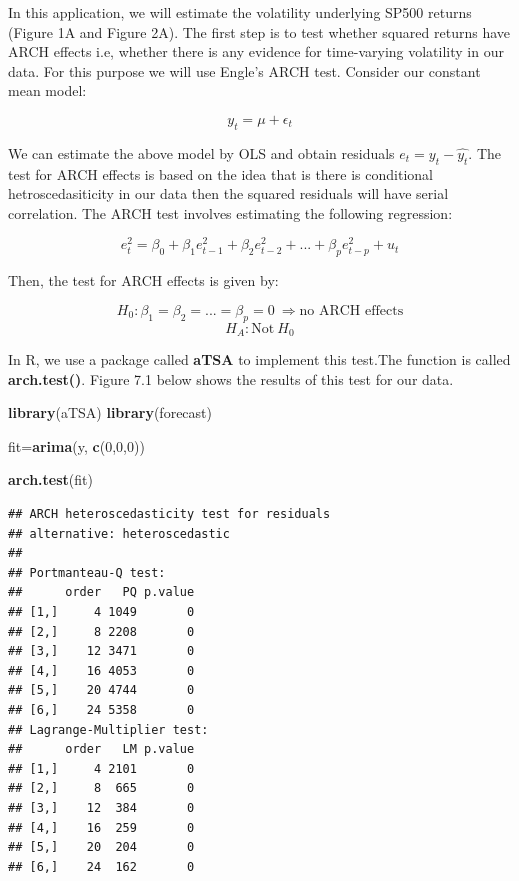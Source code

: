 \documentclass[]{book}
\newenvironment{Shaded}{\begin{snugshade}}{\end{snugshade}}
\newcommand{\DecValTok}[1]{\textcolor[rgb]{0.00,0.00,0.81}{#1}}
\newcommand{\KeywordTok}[1]{\textcolor[rgb]{0.13,0.29,0.53}{\textbf{#1}}}
\newcommand{\NormalTok}[1]{#1}
\theoremstyle{definition}
\theoremstyle{definition}
\theoremstyle{definition}
\theoremstyle{remark}
\begin{document}
In this application, we will estimate the volatility underlying SP500
returns (Figure 1A and Figure 2A). The first step is to test whether
squared returns have ARCH effects i.e, whether there is any evidence for
time-varying volatility in our data. For this purpose we will use
Engle's ARCH test. Consider our constant mean model:

\[y_t=\mu +\epsilon_t\]

We can estimate the above model by OLS and obtain residuals
\(e_t=y_t-\hat{y_t}\). The test for ARCH effects is based on the idea
that is there is conditional hetroscedasiticity in our data then the
squared residuals will have serial correlation. The ARCH test involves
estimating the following regression:

\[e^2_t= \beta_0 +\beta_1 e^2_{t-1} + \beta_2 e^2_{t-2}+...+ \beta_p e^2_{t-p} + u_t\]

Then, the test for ARCH effects is given by:

\[H_0: \beta_1=\beta_2=...=\beta_p=0 \ \Rightarrow \text{no ARCH effects}\]
\[ H_A: \text{Not} \ H_0\]

In R, we use a package called \textbf{aTSA} to implement this test.The
function is called \textbf{arch.test()}. Figure 7.1 below shows the
results of this test for our data.

\begin{Shaded}
\begin{Highlighting}[]
\KeywordTok{library}\NormalTok{(aTSA)}
\KeywordTok{library}\NormalTok{(forecast)}

\NormalTok{fit=}\KeywordTok{arima}\NormalTok{(y, }\KeywordTok{c}\NormalTok{(}\DecValTok{0}\NormalTok{,}\DecValTok{0}\NormalTok{,}\DecValTok{0}\NormalTok{))}

\KeywordTok{arch.test}\NormalTok{(fit)}
\end{Highlighting}
\end{Shaded}

\begin{verbatim}
## ARCH heteroscedasticity test for residuals 
## alternative: heteroscedastic 
## 
## Portmanteau-Q test: 
##      order   PQ p.value
## [1,]     4 1049       0
## [2,]     8 2208       0
## [3,]    12 3471       0
## [4,]    16 4053       0
## [5,]    20 4744       0
## [6,]    24 5358       0
## Lagrange-Multiplier test: 
##      order   LM p.value
## [1,]     4 2101       0
## [2,]     8  665       0
## [3,]    12  384       0
## [4,]    16  259       0
## [5,]    20  204       0
## [6,]    24  162       0
\end{verbatim}
\end{document}
